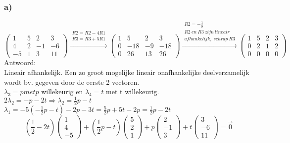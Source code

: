 \documentclass[11pt]{article}
\begin{document}
\subsubsection*{a)}
\[
 \begin{pmatrix}
1 & 5 & 2 & 3 \\
4 & 2 & -1 & -6 \\
-5 & 1 & 3 & 11
 \end{pmatrix}
  \overset{\begin{matrix}
  R2 = R2-4R1 \\
  R3 = R3+5R1
 \end{matrix}}{\rightarrow}
 \begin{pmatrix}
1 & 5 & 2 & 3 \\
0 & -18 & -9 & -18 \\
0 & 26 & 13 & 26
 \end{pmatrix}
 \overset{\begin{matrix}
  R2 = -\frac{1}{9} \\
  R2\:en\:R3\:zijn\:lineair\\afhankelijk,\;schrap\:R3
 \end{matrix}}{\rightarrow}
 \begin{pmatrix}
1 & 5 & 2 & 3 \\
0 & 2 & 1 & 2 \\
0 & 0 & 0 & 0
 \end{pmatrix}
\]
Antwoord:\\
Lineair afhankelijk. Een zo groot mogelijke lineair onafhankelijke deelverzamelijk wordt bv. gegeven door de eerste 2 vectoren.\\
$\lambda_3 = p met p$ willekeurig en $\lambda_4 = t$ met t willekeurig.\\
$2\lambda_2 = -p-2t \Rightarrow \lambda_2=\frac{1}{2}p-t$\\
$\lambda_1=-5(-\frac{1}{2}p-t) -2p-3t=\frac{5}{2}p+5t-2p = \frac{1}{2}p-2t$
\[
(\frac{1}{2}-2t)\begin{pmatrix}1\\4\\-5\end{pmatrix}+(\frac{1}{2}p-t)\begin{pmatrix}5\\2\\1\end{pmatrix}+p\begin{pmatrix}2\\-1\\3\end{pmatrix}+t
\begin{pmatrix}3\\-6\\11\end{pmatrix} = \vec{0}
\]
\end{document}
